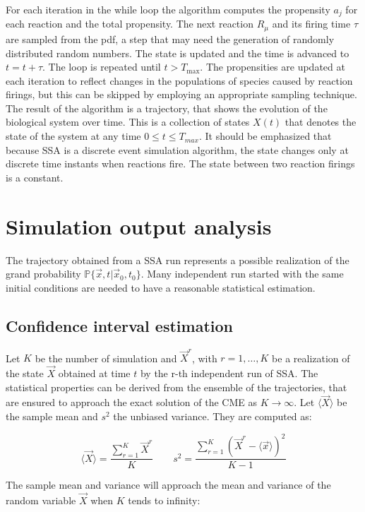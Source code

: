   

  For each iteration in the while loop the algorithm computes the propensity $a_j$ for each reaction and the total propensity.
  The next reaction $R_\mu$ and its firing time $\tau$ are sampled from the pdf, a step that may need the generation of randomly distributed random numbers.
  The state is updated and the time is advanced to $t=t+\tau$.
  The loop is repeated until $t>T_{\max}$.
  The propensities are updated at each iteration to reflect changes in the populations of species caused by reaction firings, but this can be skipped by employing an appropriate sampling technique.
  The result of the algorithm is a trajectory, that shows the evolution of the biological system over time.
  This is a collection of states $X(t)$ that denotes the state of the system at any time $0\le t\le T_{max}$.
  It should be emphasized that because SSA is a discrete event simulation algorithm, the state changes only at discrete time instants when reactions fire.
  The state between two reaction firings is a constant.

\section{Simulation output analysis}
The trajectory obtained from a SSA run represents a possible realization of the grand probability $\mathbb{P}\{\vec{x},t|\vec{x}_0, t_0\}$.
Many independent run started with the same initial conditions are needed to have a reasonable statistical estimation.

  \subsection{Confidence interval estimation}
  Let $K$ be the number of simulation and $\vec{X}^r$, with $r = 1, \dots, K$ be a realization of the state $\vec{X}$ obtained at time $t$ by the r-th independent run of SSA.
  The statistical properties can be derived from the ensemble of the trajectories, that are ensured to approach the exact solution of the CME as $K\rightarrow\infty$.
  Let $\langle \vec{X}\rangle$ be the sample mean and $s^2$ the unbiased variance.
  They are computed as:

  $$\langle\vec{X}\rangle = \frac{\sum\limits_{r=1}^K\vec{X}^r}{K}\qquad s^2=\frac{\sum\limits_{r=1}^K(\vec{X}^r-\langle\vec{x}\rangle)^2}{K-1}$$

  The sample mean and variance will approach the mean and variance of the random variable $\vec{X}$ when $K$ tends to infinity:

